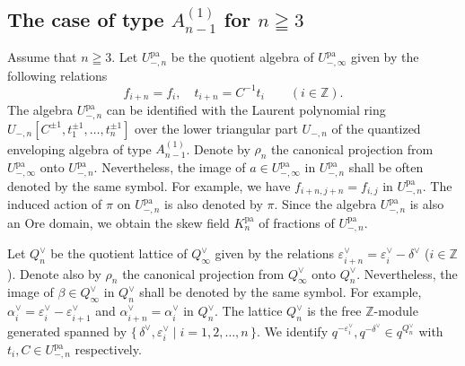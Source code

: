 \documentclass[12pt,twoside]{article}
\newcommand\av{\alpha^\vee}
\newcommand\eps{\varepsilon}
\newcommand\epsv{\eps^\vee}
\newcommand\deltav{\delta^\vee}
\newcommand\Qv{Q^\vee}
\newcommand\pa{{\mathrm{pa}}}
\newcommand\Z{{\mathbb Z}} %
\theoremstyle{plain} %
\theoremstyle{definition} %
\theoremstyle{definition} %
\numberwithin{theorem}{section}
\numberwithin{equation}{section}
\numberwithin{figure}{section}
\numberwithin{table}{section}
\begin{document}

\subsection{The case of type $A^{(1)}_{n-1}$ for $n\geqq 3$}
\label{sec:A^{(1)}_{n-1}}

Assume that $n\geqq 3$.
Let $U_{-,n}^\pa$ be the quotient algebra of $U_{-,\infty}^\pa$
given by the following relations
\begin{equation*}
 f_{i+n} = f_i, \quad t_{i+n} = C^{-1}t_i \qquad (i\in\Z).
\end{equation*}
The algebra $U_{-,n}^\pa$ can be identified with 
the Laurent polynomial ring 
$U_{-,n}[C^{\pm1},t_1^{\pm1},\ldots,t_n^{\pm1}]$
over the lower triangular part $U_{-,n}$ of 
the quantized enveloping algebra of type $A^{(1)}_{n-1}$. 
Denote by $\rho_n$ the canonical projection 
from $U_{-,\infty}^\pa$ onto $U_{-,n}^\pa$.
Nevertheless, the image of $a\in U_{-,\infty}^\pa$ in $U_{-,n}^\pa$ 
shall be often denoted by the same symbol.  For example, we have 
$f_{i+n,j+n}=f_{i,j}$ in $U_{-,n}^\pa$.
The induced action of $\pi$ on $U_{-,n}^\pa$ is also denoted by $\pi$.
Since the algebra $U_{-,n}^\pa$ is also an Ore domain, 
we obtain the skew field $K_n^\pa$ of fractions of $U_{-,n}^\pa$.

Let $\Qv_n$ be the quotient lattice of $\Qv_\infty$
given by the relations $\epsv_{i+n}=\epsv_i-\deltav$ ($i\in\Z$).
Denote also by $\rho_n$ the canonical projection 
from $\Qv_\infty$ onto $\Qv_n$.
Nevertheless, the image of $\beta\in\Qv_\infty$ in $\Qv_n$ 
shall be denoted by the same symbol.
For example, $\av_i = \epsv_i - \epsv_{i+1}$ and $\av_{i+n}=\av_i$
in $\Qv_n$.
The lattice $\Qv_n$ is the free $\Z$-module generated 
spanned by $\{\,\deltav,\epsv_i\mid i=1,2,\ldots,n\,\}$.
We identify $q^{-\epsv_i},q^{-\deltav}\in q^{\Qv_n}$ 
with $t_i,C\in U_{-,n}^\pa$ respectively.
\end{document}
